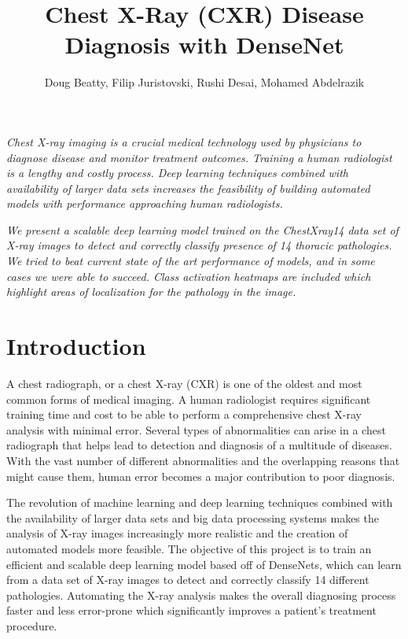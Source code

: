 \documentclass{amia}
\begin{document}
\title{Chest X-Ray (CXR) Disease Diagnosis with DenseNet}

\author{Doug Beatty, Filip Juristovski, Rushi Desai, Mohamed Abdelrazik}


\maketitle


\textit{Chest X-ray imaging \cite{ref1} is a crucial medical technology used by physicians to diagnose disease and monitor treatment outcomes. Training a human radiologist is a lengthy and costly process. Deep learning techniques combined with availability of larger data sets increases the feasibility of building automated models with performance approaching human radiologists.}

\textit{We present a scalable deep learning model trained on the ChestXray14 \cite{ref7} data set of X-ray images to detect and correctly classify presence of 14 thoracic pathologies. We tried to beat current state of the art performance of models, and in some cases we were able to succeed. Class activation heatmaps are included which highlight areas of localization for the pathology in the image.}

\section*{Introduction}
A chest radiograph\cite{ref1}, or a chest X-ray (CXR) is one of the oldest and most common forms of medical imaging. A human radiologist requires significant training time and cost to be able to perform a comprehensive chest X-ray analysis with minimal error. Several types of abnormalities can arise in a chest radiograph that helps lead to detection and diagnosis of a multitude of diseases. With the vast number of different abnormalities and the overlapping reasons that might cause them, human error becomes a major contribution to poor diagnosis.

The revolution of machine learning and deep learning techniques combined with the availability of larger data sets\cite{ref2} and big data processing systems\cite{ref3} makes the analysis of X-ray images increasingly more realistic and the creation of automated models more feasible. The objective of this project is to train an efficient and scalable deep learning model based off of DenseNets\cite{ref4}, which can learn from a data set of X-ray images to detect and correctly classify 14 different pathologies. Automating the X-ray analysis makes the overall diagnosing process faster and less error-prone which significantly improves a patient’s treatment procedure.
\end{document}

